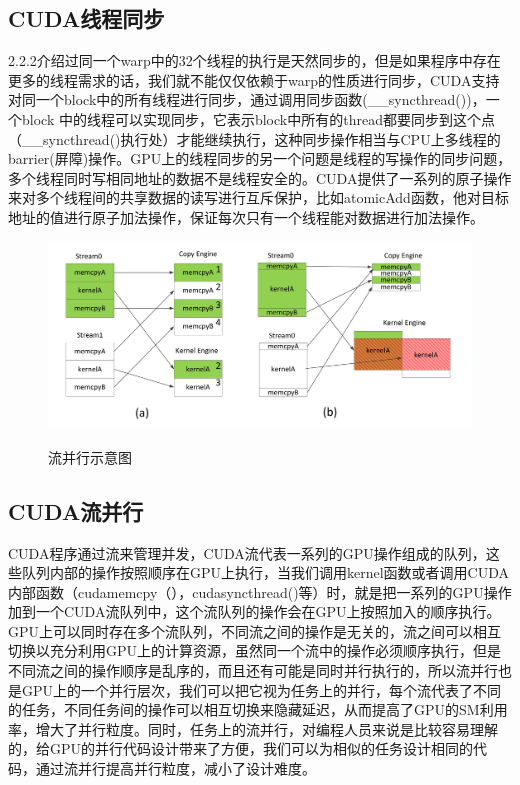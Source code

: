 \subsection{CUDA线程同步}
2.2.2介绍过同一个warp中的32个线程的执行是天然同步的，但是如果程序中存在更多的线程需求的话，我们就不能仅仅依赖于warp的性质进行同步，CUDA支持对同一个block中的所有线程进行同步，通过调用同步函数(\_\_syncthread())，一个block 中的线程可以实现同步，它表示block中所有的thread都要同步到这个点（\_\_syncthread()执行处）才能继续执行，这种同步操作相当与CPU上多线程的barrier(屏障)操作。GPU上的线程同步的另一个问题是线程的写操作的同步问题，多个线程同时写相同地址的数据不是线程安全的。CUDA提供了一系列的原子操作来对多个线程间的共享数据的读写进行互斥保护，比如atomicAdd函数，他对目标地址的值进行原子加法操作，保证每次只有一个线程能对数据进行加法操作。
\begin{figure}
\setlength{\belowcaptionskip}{-0.5cm}
\begin{center}
{\includegraphics[width=1 \textwidth]{figures/flow.pdf}}
\end{center}
\caption{{\footnotesize{流并行示意图}}}
\label{flow}
\end{figure}
\subsection{CUDA流并行}
CUDA程序通过流来管理并发，CUDA流代表一系列的GPU操作组成的队列，这些队列内部的操作按照顺序在GPU上执行，当我们调用kernel函数或者调用CUDA内部函数（cudamemcpy（），cudasyncthread()等）时，就是把一系列的GPU操作加到一个CUDA流队列中，这个流队列的操作会在GPU上按照加入的顺序执行。GPU上可以同时存在多个流队列，不同流之间的操作是无关的，流之间可以相互切换以充分利用GPU上的计算资源，虽然同一个流中的操作必须顺序执行，但是不同流之间的操作顺序是乱序的，而且还有可能是同时并行执行的，所以流并行也是GPU上的一个并行层次，我们可以把它视为任务上的并行，每个流代表了不同的任务，不同任务间的操作可以相互切换来隐藏延迟，从而提高了GPU的SM利用率，增大了并行粒度。同时，任务上的流并行，对编程人员来说是比较容易理解的，给GPU的并行代码设计带来了方便，我们可以为相似的任务设计相同的代码，通过流并行提高并行粒度，减小了设计难度。

